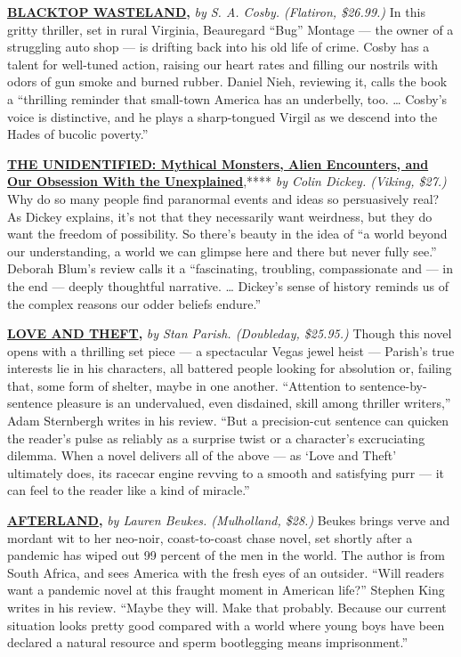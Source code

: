 \href{https://www.nytimes3xbfgragh.onion/2020/07/17/books/review/blacktop-wasteland-s-a-cosby.html}{\textbf{\textbf{BLACKTOP
WASTELAND}}}\textbf{\textbf{,}} \emph{by S. A. Cosby. (Flatiron,
\$26.99.)} In this gritty thriller, set in rural Virginia, Beauregard
``Bug'' Montage --- the owner of a struggling auto shop --- is drifting
back into his old life of crime. Cosby has a talent for well-tuned
action, raising our heart rates and filling our nostrils with odors of
gun smoke and burned rubber. Daniel Nieh, reviewing it, calls the book a
``thrilling reminder that small-town America has an underbelly, too.
\ldots{} Cosby's voice is distinctive, and he plays a sharp-tongued
Virgil as we descend into the Hades of bucolic poverty.''

\textbf{\href{https://www.nytimes3xbfgragh.onion/2020/07/21/books/review/the-unidentified-colin-dickey.html}{\textbf{THE
UNIDENTIFIED: Mythical Monsters, Alien Encounters, and Our Obsession
With the Unexplained}}},**** \emph{by Colin Dickey. (Viking, \$27.)} Why
do so many people find paranormal events and ideas so persuasively real?
As Dickey explains, it's not that they necessarily want weirdness, but
they do want the freedom of possibility. So there's beauty in the idea
of ``a world beyond our understanding, a world we can glimpse here and
there but never fully see.'' Deborah Blum's review calls it a
``fascinating, troubling, compassionate and --- in the end --- deeply
thoughtful narrative. \ldots{} Dickey's sense of history reminds us of
the complex reasons our odder beliefs endure.''

\href{https://www.nytimes3xbfgragh.onion/2020/07/23/books/review/stan-parish-love-and-theft.html}{\textbf{\textbf{LOVE
AND THEFT}}}\textbf{\textbf{,}} \emph{by Stan Parish. (Doubleday,
\$25.95.)} Though this novel opens with a thrilling set piece --- a
spectacular Vegas jewel heist --- Parish's true interests lie in his
characters, all battered people looking for absolution or, failing that,
some form of shelter, maybe in one another. ``Attention to
sentence-by-sentence pleasure is an undervalued, even disdained, skill
among thriller writers,'' Adam Sternbergh writes in his review. ``But a
precision-cut sentence can quicken the reader's pulse as reliably as a
surprise twist or a character's excruciating dilemma. When a novel
delivers all of the above --- as `Love and Theft' ultimately does, its
racecar engine revving to a smooth and satisfying purr --- it can feel
to the reader like a kind of miracle.''

\href{https://www.nytimes3xbfgragh.onion/2020/07/24/books/review/lauren-beukes-afterland.html}{\textbf{\textbf{AFTERLAND}}}\textbf{\textbf{,}}
\emph{by Lauren Beukes. (Mulholland, \$28.)} Beukes brings verve and
mordant wit to her neo-noir, coast-to-coast chase novel, set shortly
after a pandemic has wiped out 99 percent of the men in the world. The
author is from South Africa, and sees America with the fresh eyes of an
outsider. ``Will readers want a pandemic novel at this fraught moment in
American life?'' Stephen King writes in his review. ``Maybe they will.
Make that probably. Because our current situation looks pretty good
compared with a world where young boys have been declared a natural
resource and sperm bootlegging means imprisonment.''

